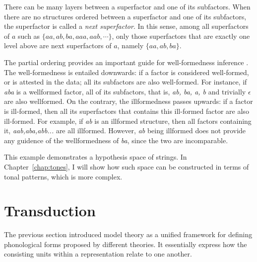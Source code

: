 There can be many layers between a superfactor and one of its 
subfactors. When there are no structures ordered 
between a superfactor and one of its subfactors, the 
superfactor is called a \textit{next superfactor}. 
In this sense, among all superfactors of \(a\) such as 
\(\{aa, ab, ba, aaa, aab, \cdots\}\), only those superfactors that 
are exactly one level above are next superfactors of \(a\), 
namely \(\{aa, ab, ba\}\).

The partial ordering provides an important guide for well-formedness inference \citep{Yolyan2025,chandleeBufia2019,rawski2021structure}. The well-formedness is entailed downwards: if a factor is considered
well-formed, or is attested in the data; all its subfactors are also well-formed. For instance, if \textit{aba} is a wellformed factor, all of its subfactors, that is, \textit{ab, ba, a, b} and trivially \(\epsilon\) 
are also wellformed. On the contrary, the 
illformedness passes upwards:
if a factor is ill-formed, then all its
superfactors that contains this ill-formed factor are also ill-formed. For example, if \textit{ab} is an illformed structure, then
all factors containing it, \textit{aab,aba,abb...} are all illformed. However, \textit{ab} being illformed does not provide any guidence of the wellformedness of \textit{ba}, since the two are incomparable.

This example demonstrates a hypothesis space of strings. In Chapter~\ref{chap:tones}, I will show how such space can be constructed in terms of tonal patterns, which is more complex.


\section {Transduction}
\label{sec:transduction}

The previous section introduced model theory as a unified framework for 
defining phonological forms proposed by different theories. It essentially 
express how the consisting units within a representation relate to one 
another.


